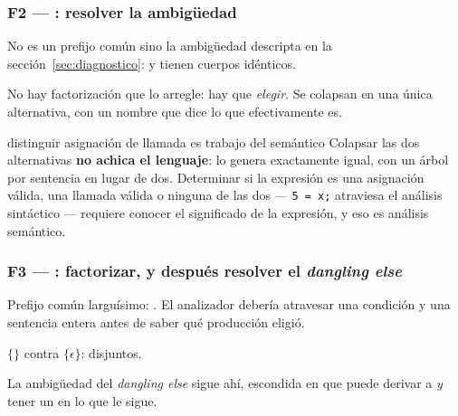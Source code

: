 \subsubsection{F2 --- : resolver la ambigüedad}

 No es un prefijo común sino la ambigüedad descripta en la
sección~\ref{sec:diagnostico}:  y  tienen cuerpos idénticos.

 No hay factorización que lo arregle: hay que \emph{elegir}. Se colapsan
en una única alternativa, con un nombre que dice lo que efectivamente es.

\begin{producciones}
\end{producciones}

\begin{decision}{distinguir asignación de llamada es trabajo del semántico}
Colapsar las dos alternativas \textbf{no achica el lenguaje}: lo genera exactamente igual, con un
árbol por sentencia en lugar de dos. Determinar si la expresión es una asignación válida, una
llamada válida o ninguna de las dos --- \texttt{5 = x;} atraviesa el análisis sintáctico ---
requiere conocer el significado de la expresión, y eso es análisis semántico.
\end{decision}

\subsubsection{F3 --- : factorizar, y después resolver el \emph{dangling else}}

 Prefijo común larguísimo:  \tl{(}  \tl{)} . El
analizador debería atravesar una condición y una sentencia entera antes de saber qué producción
eligió.

\begin{producciones}
\end{producciones}
$\{$$\}$ contra $\{\epsilon\}$: disjuntos.

 La ambigüedad del \emph{dangling else} sigue ahí,
escondida en que  puede derivar a \eps{} \emph{y} tener un  en lo que le
sigue.

